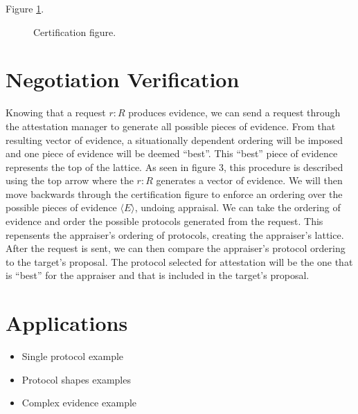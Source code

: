 \documentclass[sigconf,authordraft]{acmart}
\begin{document}
Figure \ref{fig:certification-fig}.

\begin{figure}[hbtp]
  \centering 
  \caption[Attestation process]{Certification figure.}
  \label{fig:certification-fig}
\end{figure}

 

\section{Negotiation Verification}

Knowing that a request $r:R$ produces evidence, we can send a request
through the attestation manager to generate all possible pieces of
evidence. From that resulting vector of evidence, a situationally
dependent ordering will be imposed and one piece of evidence will be
deemed ``best''. This ``best'' piece of evidence represents the top of
the lattice. As seen in figure 3, this procedure is described using
the top arrow where the $r:R$ generates a vector of evidence. We will
then move backwards through the certification figure to enforce an
ordering over the possible pieces of evidence $\langle E \rangle$,
undoing appraisal. We can take the ordering of evidence and order the
possible protocols generated from the request. This repensents the
appraiser's ordering of protocols, creating the appraiser's
lattice. After the request is sent, we can then compare the
appraiser's protocol ordering to the target's proposal. The protocol
selected for attestation will be the one that is ``best'' for the
appraiser and that is included in the target's proposal.

\section{Applications}

\begin{itemize}
\item Single protocol example
\item Protocol shapes examples
\item Complex evidence example

\end{itemize}
\end{document}
